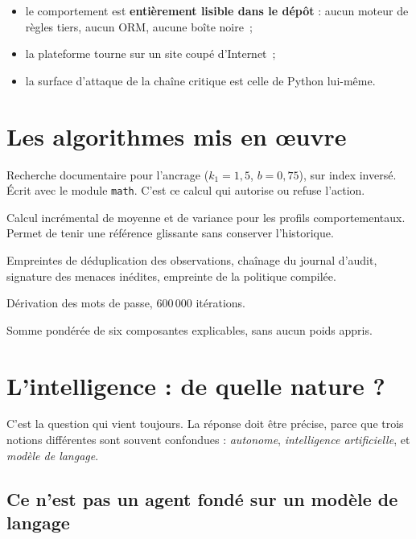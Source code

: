 \begin{itemize}[leftmargin=*]
  \item le comportement est \textbf{entièrement lisible dans le dépôt} : aucun
        moteur de règles tiers, aucun ORM, aucune boîte noire~;
  \item la plateforme tourne sur un site coupé d'Internet~;
  \item la surface d'attaque de la chaîne critique est celle de Python
        lui-même.
\end{itemize}

\section{Les algorithmes mis en œuvre}

\begin{description}[leftmargin=3.4cm, style=nextline]
  \item[BM25 Okapi] Recherche documentaire pour l'ancrage
        ($k_1 = 1{,}5$, $b = 0{,}75$), sur index inversé. Écrit avec le module
        \texttt{math}. C'est ce calcul qui autorise ou refuse l'action.
  \item[Welford] Calcul incrémental de moyenne et de variance pour les profils
        comportementaux. Permet de tenir une référence glissante sans conserver
        l'historique.
  \item[SHA-256] Empreintes de déduplication des observations, chaînage du
        journal d'audit, signature des menaces inédites, empreinte de la
        politique compilée.
  \item[PBKDF2-HMAC-SHA256] Dérivation des mots de passe, 600\,000 itérations.
  \item[Score de risque] Somme pondérée de six composantes explicables, sans
        aucun poids appris.
\end{description}

\section{L'intelligence : de quelle nature ?}

C'est la question qui vient toujours. La réponse doit être précise, parce que
trois notions différentes sont souvent confondues : \emph{autonome},
\emph{intelligence artificielle}, et \emph{modèle de langage}.

\subsection{Ce n'est pas un agent fondé sur un modèle de langage}

